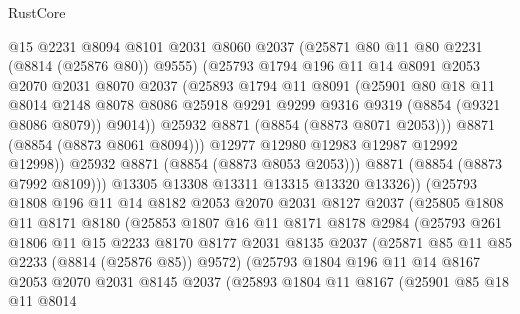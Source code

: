 \begin{lexlean}{RustCore}
\begin{coremodule}
                  @15
                  @2231
                  @8094
                  @8101
                  @2031
                  @8060
                  @2037
                  (@25871 @80 @11 @80 @2231 (@8814 (@25876 @80)) @9555)
                  (@25793
                    @1794
                    @196
                    @11
                    @14
                    @8091
                    @2053
                    @2070
                    @2031
                    @8070
                    @2037
                    (@25893
                      @1794
                      @11
                      @8091
                      (@25901
                        @80
                        @18
                        @11
                        @8014
                        @2148
                        @8078
                        @8086
                        @25918
                        @9291
                        @9299
                        @9316
                        @9319
                        (@8854 (@9321 @8086 @8079))
                        @9014))
                    @25932
                    @8871
                    (@8854 (@8873 @8071 @2053)))
                  @8871
                  (@8854 (@8873 @8061 @8094)))
                @12977
                @12980
                @12983
                @12987
                @12992
                @12998))
            @25932
            @8871
            (@8854 (@8873 @8053 @2053)))
          @8871
          (@8854 (@8873 @7992 @8109)))
        @13305
        @13308
        @13311
        @13315
        @13320
        @13326))
    (@25793
      @1808
      @196
      @11
      @14
      @8182
      @2053
      @2070
      @2031
      @8127
      @2037
      (@25805
        @1808
        @11
        @8171
        @8180
        (@25853
          @1807
          @16
          @11
          @8171
          @8178
          @2984
          (@25793
            @261
            @1806
            @11
            @15
            @2233
            @8170
            @8177
            @2031
            @8135
            @2037
            (@25871 @85 @11 @85 @2233 (@8814 (@25876 @85)) @9572)
            (@25793
              @1804
              @196
              @11
              @14
              @8167
              @2053
              @2070
              @2031
              @8145
              @2037
              (@25893
                @1804
                @11
                @8167
                (@25901
                  @85
                  @18
                  @11
                  @8014

\end{coremodule}
\end{lexlean}
